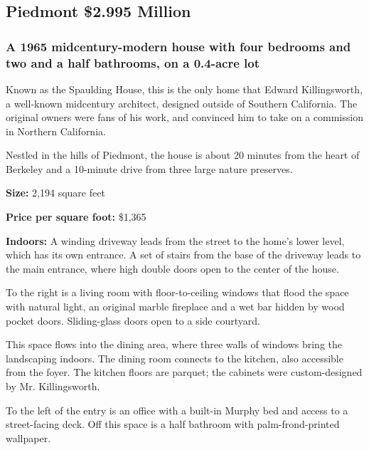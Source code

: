 \hypertarget{piedmont--2995-million}{%
\subsection{Piedmont \textbar{} \$2.995
Million}\label{piedmont--2995-million}}

\hypertarget{a-1965-midcentury-modern-house-with-four-bedrooms-and-two-and-a-half-bathrooms-on-a-04-acre-lot}{%
\subsubsection{\texorpdfstring{\textbf{A 1965 midcentury-modern house
with four bedrooms and two and a half bathrooms, on a 0.4-acre
lot}}{A 1965 midcentury-modern house with four bedrooms and two and a half bathrooms, on a 0.4-acre lot}}\label{a-1965-midcentury-modern-house-with-four-bedrooms-and-two-and-a-half-bathrooms-on-a-04-acre-lot}}

Known as the Spaulding House, this is the only home that Edward
Killingsworth, a well-known midcentury architect, designed outside of
Southern California. The original owners were fans of his work, and
convinced him to take on a commission in Northern California.

Nestled in the hills of Piedmont, the house is about 20 minutes from the
heart of Berkeley and a 10-minute drive from three large nature
preserves.

\textbf{Size:} 2,194 square feet

\textbf{Price per square foot:} \$1,365

\textbf{Indoors:} A winding driveway leads from the street to the home's
lower level, which has its own entrance. A set of stairs from the base
of the driveway leads to the main entrance, where high double doors open
to the center of the house.

To the right is a living room with floor-to-ceiling windows that flood
the space with natural light, an original marble fireplace and a wet bar
hidden by wood pocket doors. Sliding-glass doors open to a side
courtyard.

This space flows into the dining area, where three walls of windows
bring the landscaping indoors. The dining room connects to the kitchen,
also accessible from the foyer. The kitchen floors are parquet; the
cabinets were custom-designed by Mr. Killingsworth.

To the left of the entry is an office with a built-in Murphy bed and
access to a street-facing deck. Off this space is a half bathroom with
palm-frond-printed wallpaper.

